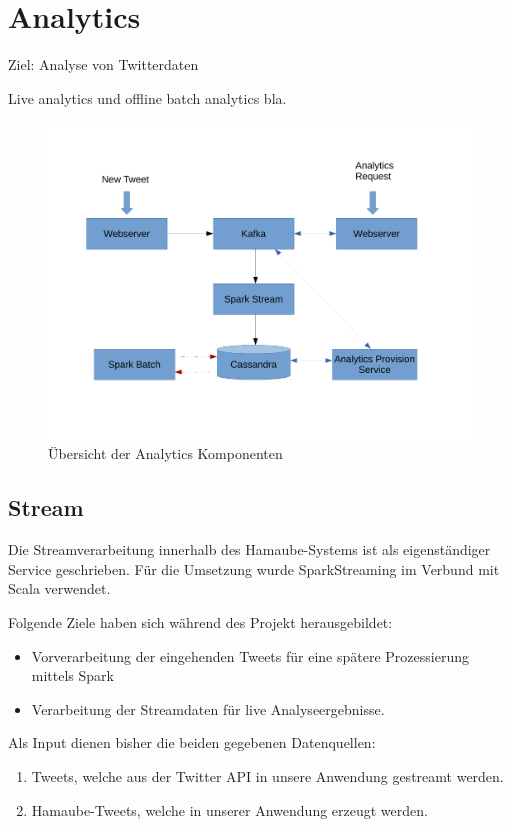 

\chapter{Analytics}
\label{Analytics}

Ziel: Analyse von Twitterdaten

Live analytics und offline batch analytics bla.

\begin{figure}[H]
	\includegraphics[width=\textwidth]{pics/analytics/archi}
	\caption{Übersicht der Analytics Komponenten}
\end{figure}

\section{Stream}

Die Streamverarbeitung innerhalb des Hamaube-Systems ist als eigenständiger Service geschrieben. Für die Umsetzung wurde SparkStreaming im Verbund mit Scala verwendet.

Folgende Ziele haben sich während des Projekt herausgebildet:
\begin{itemize}
	\item Vorverarbeitung der eingehenden Tweets für eine spätere Prozessierung mittels Spark
	\item Verarbeitung der Streamdaten für live Analyseergebnisse.
\end{itemize}


Als Input dienen bisher die beiden gegebenen Datenquellen:
\begin{enumerate}
	\item Tweets, welche aus der Twitter API in unsere Anwendung gestreamt werden.
	\item Hamaube-Tweets, welche in unserer Anwendung erzeugt werden.
\end{enumerate}

